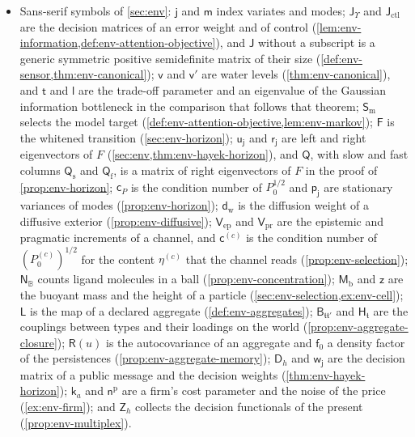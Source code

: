 \begin{itemize}
level $l$ (Supplement, \cref{prop:ren-consensus-levels}); $\mathsf H$, $\mathsf H_\Sigma$, $\mathsf z_i$ and $\mathsf x_\Pi$ are the rescaled symbol of a decimated covariance on the axis as a function of $\cos p_1$, the sum of its weights, its zeros and the ratio $\varepsilon^\Pi/a^\Pi+4$ (Supplement, \cref{prop:ren-decay-rate}); $\mathsf o$ is the parameter of the three codes of \cref{ex:ren-rank-nonmonotone}, the cosine of the angle between the first two (Supplement); and $\mathsf K^{(1)}_k$ is the coarse read kernel built from the read kernel $\mathsf K_k$ (\cref{thm:ren-closure}).
\item Sans-serif symbols of \cref{sec:env}: $\mathsf j$ and $\mathsf m$ index variates and modes; $\mathsf J_\Upsilon$ and $\mathsf J_{\mathrm{ctl}}$ are the decision matrices of an error weight and of control (\cref{lem:env-information,def:env-attention-objective}), and $\mathsf J$ without a subscript is a generic symmetric positive semidefinite matrix of their size (\cref{def:env-sensor,thm:env-canonical}); $\mathsf v$ and $\mathsf v'$ are water levels (\cref{thm:env-canonical}), and $\mathsf t$ and $\mathsf l$ are the trade-off parameter and an eigenvalue of the Gaussian information bottleneck in the comparison that follows that theorem; $\mathsf S_{\mathrm m}$ selects the model target (\cref{def:env-attention-objective,lem:env-markov}); $\mathsf F$ is the whitened transition (\cref{sec:env-horizon}); $\mathsf u_{\mathsf j}$ and $\mathsf r_{\mathsf j}$ are left and right eigenvectors of $F$ (\cref{sec:env,thm:env-hayek-horizon}), and $\mathsf Q$, with slow and fast columns $\mathsf Q_{\mathrm s}$ and $\mathsf Q_{\mathrm f}$, is a matrix of right eigenvectors of $F$ in the proof of \cref{prop:env-horizon}; $\mathsf c_P$ is the condition number of $P_0^{1/2}$ and $\mathsf p_{\mathsf j}$ are stationary variances of modes (\cref{prop:env-horizon}); $\mathsf d_{\mathrm w}$ is the diffusion weight of a diffusive exterior (\cref{prop:env-diffusive}); $\mathsf V_{\mathrm{ep}}$ and $\mathsf V_{\mathrm{pr}}$ are the epistemic and pragmatic increments of a channel, and $\mathsf c^{(c)}$ is the condition number of $(P^{(c)}_0)^{1/2}$ for the content $\eta^{(c)}$ that the channel reads (\cref{prop:env-selection}); $\mathsf N_{\mathbb B}$ counts ligand molecules in a ball (\cref{prop:env-concentration}); $\mathsf M_{\mathrm b}$ and $\mathsf z$ are the buoyant mass and the height of a particle (\cref{sec:env-selection,ex:env-cell}); $\mathsf L$ is the map of a declared aggregate (\cref{def:env-aggregates}); $\mathsf B_{\mathfrak t\mathfrak t'}$ and $\mathsf H_{\mathfrak t}$ are the couplings between types and their loadings on the world (\cref{prop:env-aggregate-closure}); $\mathsf R(u)$ is the autocovariance of an aggregate and $\mathsf f_0$ a density factor of the persistences (\cref{prop:env-aggregate-memory}); $\mathsf D_h$ and $\mathsf w_{\mathsf j}$ are the decision matrix of a public message and the decision weights (\cref{thm:env-hayek-horizon}); $\mathsf k_a$ and $\mathsf n^{\mathrm p}$ are a firm's cost parameter and the noise of the price (\cref{ex:env-firm}); and $\mathsf Z_h$ collects the decision functionals of the present (\cref{prop:env-multiplex}).

\end{itemize}
